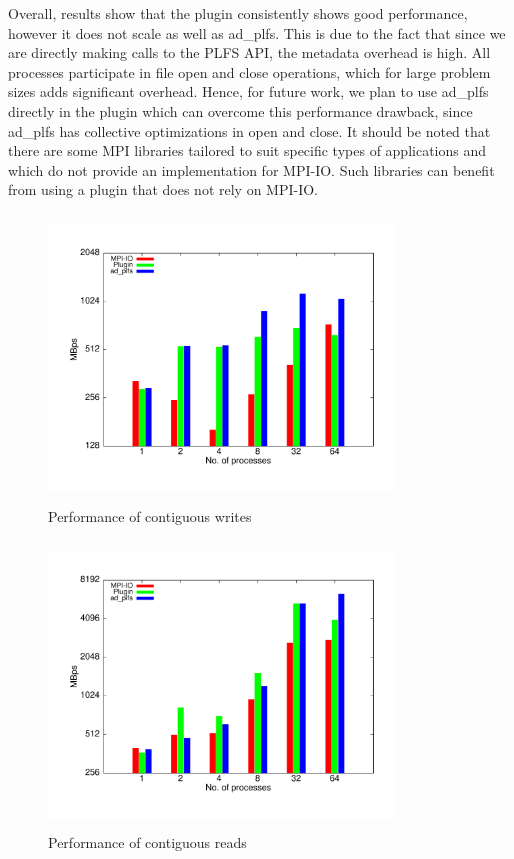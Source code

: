 Overall, results show that the plugin consistently shows good performance, however it does not scale as well as ad\_plfs. This is due to the fact that since we are directly making calls to the PLFS API, the metadata overhead is high. All processes participate in file open and close operations, which for large problem sizes adds significant overhead. Hence, for future work, we plan to use ad\_plfs directly in the plugin which can overcome this performance drawback, since ad\_plfs has collective optimizations in open and close. It should be noted that there are some MPI libraries tailored to suit specific types of applications and which do not provide an implementation for MPI-IO. Such libraries can benefit from using a plugin that does not rely on MPI-IO. 

\begin{figure}[!t]
\centering
\includegraphics[width=3.6in,height=3.0in]{contig_w}
\caption{Performance of contiguous writes}
\label{write_contig}
\end{figure}

\begin{figure}[!t]
\centering
\includegraphics[width=3.6in,height=3.0in]{contig_r}
\caption{Performance of contiguous reads}
\label{read_contig}
\end{figure}

